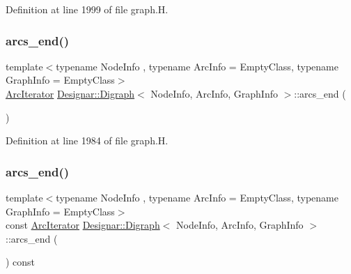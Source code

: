 Definition at line 1999 of file graph.\+H.

\mbox{\label{class_designar_1_1_digraph_af4e39baa2e8370cfda5f61f551b3091f}} 
\subsubsection{\texorpdfstring{arcs\+\_\+end()}{arcs\_end()}\hspace{0.1cm}{\footnotesize\ttfamily [1/4]}}
{\footnotesize\ttfamily template$<$typename Node\+Info , typename Arc\+Info  = Empty\+Class, typename Graph\+Info  = Empty\+Class$>$ \\
\hyperlink{class_designar_1_1_digraph_1_1_arc_iterator}{Arc\+Iterator} \hyperlink{class_designar_1_1_digraph}{Designar\+::\+Digraph}$<$ Node\+Info, Arc\+Info, Graph\+Info $>$\+::arcs\+\_\+end (\begin{DoxyParamCaption}{ }\end{DoxyParamCaption})\hspace{0.3cm}{\ttfamily [inline]}}



Definition at line 1984 of file graph.\+H.

\mbox{\label{class_designar_1_1_digraph_a128df54ce973f5b1f956407a7f565bc3}} 
\subsubsection{\texorpdfstring{arcs\+\_\+end()}{arcs\_end()}\hspace{0.1cm}{\footnotesize\ttfamily [2/4]}}
{\footnotesize\ttfamily template$<$typename Node\+Info , typename Arc\+Info  = Empty\+Class, typename Graph\+Info  = Empty\+Class$>$ \\
const \hyperlink{class_designar_1_1_digraph_1_1_arc_iterator}{Arc\+Iterator} \hyperlink{class_designar_1_1_digraph}{Designar\+::\+Digraph}$<$ Node\+Info, Arc\+Info, Graph\+Info $>$\+::arcs\+\_\+end (\begin{DoxyParamCaption}{ }\end{DoxyParamCaption}) const\hspace{0.3cm}{\ttfamily [inline]}}



